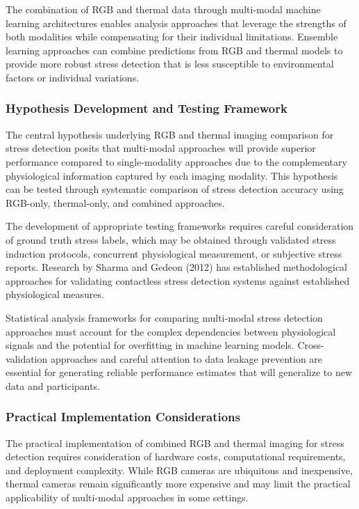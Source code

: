 \documentclass[12pt,a4paper]{article}
\begin{document}
The combination of RGB and thermal data through multi-modal machine learning architectures enables analysis approaches
that leverage the strengths of both modalities while compensating for their individual limitations. Ensemble learning
approaches can combine predictions from RGB and thermal models to provide more robust stress detection that is less
susceptible to environmental factors or individual variations.

\subsubsection{Hypothesis Development and Testing Framework}

The central hypothesis underlying RGB and thermal imaging comparison for stress detection posits that multi-modal
approaches will provide superior performance compared to single-modality approaches due to the complementary
physiological information captured by each imaging modality. This hypothesis can be tested through systematic comparison
of stress detection accuracy using RGB-only, thermal-only, and combined approaches.

The development of appropriate testing frameworks requires careful consideration of ground truth stress labels, which
may be obtained through validated stress induction protocols, concurrent physiological measurement, or subjective stress
reports. Research by Sharma and Gedeon (2012) has established methodological approaches for validating contactless
stress detection systems against established physiological measures.

Statistical analysis frameworks for comparing multi-modal stress detection approaches must account for the complex
dependencies between physiological signals and the potential for overfitting in machine learning models.
Cross-validation approaches and careful attention to data leakage prevention are essential for generating reliable
performance estimates that will generalize to new data and participants.

\subsubsection{Practical Implementation Considerations}

The practical implementation of combined RGB and thermal imaging for stress detection requires consideration of hardware
costs, computational requirements, and deployment complexity. While RGB cameras are ubiquitous and inexpensive, thermal
cameras remain significantly more expensive and may limit the practical applicability of multi-modal approaches in some
settings.
\end{document}
